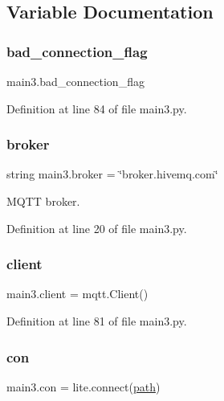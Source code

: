 \subsection{Variable Documentation}
\mbox{\label{namespacemain3_ab4939f18edc72dec9e72dfa3ec2f026b}} 
\subsubsection{\texorpdfstring{bad\+\_\+connection\+\_\+flag}{bad\_connection\_flag}}
{\footnotesize\ttfamily main3.\+bad\+\_\+connection\+\_\+flag}



Definition at line 84 of file main3.\+py.

\mbox{\label{namespacemain3_afdf3bec321b3b9107003c09223640e80}} 
\subsubsection{\texorpdfstring{broker}{broker}}
{\footnotesize\ttfamily string main3.\+broker = \char`\"{}broker.\+hivemq.\+com\char`\"{}}



M\+Q\+TT broker. 



Definition at line 20 of file main3.\+py.

\mbox{\label{namespacemain3_ac22ae978a8b5a446c25462949448abe9}} 
\subsubsection{\texorpdfstring{client}{client}}
{\footnotesize\ttfamily main3.\+client = mqtt.\+Client()}



Definition at line 81 of file main3.\+py.

\mbox{\label{namespacemain3_a4a9ab88fdf3f5bfc0803104c30ddfc98}} 
\subsubsection{\texorpdfstring{con}{con}}
{\footnotesize\ttfamily main3.\+con = lite.\+connect(\hyperlink{namespacemain3_a94593883ff80bece1776244df08104a1}{path})}



